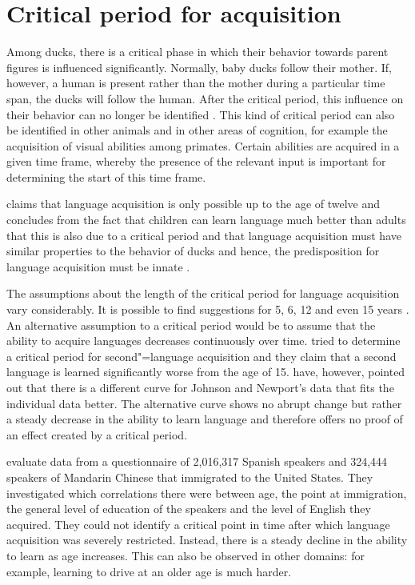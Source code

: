 \section{Critical period for acquisition}

Among ducks, there is a critical phase in which their
behavior towards parent figures is influenced significantly. Normally,
baby ducks follow their mother. If, however, a human is present rather than the mother during a particular time span, the ducks will follow the human.
After the critical period, this influence on their behavior can no longer be identified \citep{Lorenz70a-u}. This kind of critical period can also be identified
in other animals and in other areas of cognition, for example the acquisition of visual abilities among primates.
Certain abilities are acquired in a given time frame, whereby the presence of the relevant input is important for determining the start of this
time frame.

\citet{Lenneberg64a} claims that language acquisition is only possible up to the age of twelve and concludes from the fact that children can learn
language much better than adults that this is also due to a critical period and that language acquisition must have similar properties to
the behavior of ducks and hence, the predisposition for language acquisition must be innate \citep[Chapter~4]{Lenneberg67a-u}.

The assumptions about the length of the critical period for language acquisition vary considerably. It is possible to find suggestions for 5, 6, 12 and even 15 years
\citep[]{HBW2003a}. An alternative assumption to a critical period would be to assume that the ability to acquire languages decreases continuously
over time. 
\citet{JN89a} tried to determine a critical period for second"=language acquisition and they claim that a second language is learned
significantly worse from the age of 15.\nocite{Sorace2003a}
\citet*[\page]{EBJKSPP96a} have, however, pointed out that there is a different curve for Johnson and Newport's data that fits the individual data better. The alternative curve
shows no abrupt change but rather a steady decrease in the ability to learn language and therefore offers no proof of an effect created by a critical period.

\citet*{HBW2003a} evaluate data from a questionnaire of 2,016,317 Spanish speakers and 324,444 speakers of Mandarin Chinese
that immigrated to the United States. They investigated which correlations there were between age, the point at immigration, the general level of education of the speakers
and the level of English they acquired.
They could not identify a critical point in time after which language acquisition was severely restricted.
Instead, there is a steady decline in the ability to learn as age increases. This can also be observed in other
domains: for example, learning to drive at an older age is much harder.

